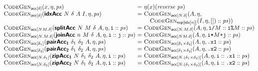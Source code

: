 \begin{figure}[H]
  \bigskip

  \begin{minipage}{1.0\linewidth}
    \begin{displaymath}
      \begin{array}{@{}l@{~}c@{~}l@{}}
        \codegenAcc{\delta}{x, \eta, \mathit{ps}}
        &=& \eta(x)(\mathit{reverse}~\mathit{ps})
        \\
        \codegenAcc{\mathsf{\delta}}{\prim{idxAcc}~N~\delta~A~I, \eta, \mathit{ps}}
        &=& \begin{array}[t]{@{}l}
          \codegenAcc{N.\delta}{A, \eta,\\ \quad\codegenExp{\mathsf{idx}[n]}{I, \eta, []} :: \mathit{ps})}
        \end{array}
        \\
        \codegenAcc{NM.\delta}{\prim{splitAcc}~N~M~\delta~A, \eta, \texttt{i} :: \mathit{ps}}
        &=& \codegenAcc{N.M.\delta}{A, \eta, \texttt{i/}M :: \texttt{i\%}M :: \mathit{ps}}
        \\
        \codegenAcc{N.M.\delta}{\prim{joinAcc}~n~M~\delta~A, \eta, \texttt{i} :: \texttt{j} :: \mathit{ps}}
        &=& \codegenAcc{NM.\delta}{A, \eta, \texttt{i*}M\texttt{+j} :: \mathit{ps}}
        \\
        \codegenAcc{\delta_1}{\prim{pairAcc_1}~\delta_1~\delta_2~A, \eta, \mathit{ps}}
        &=& \codegenAcc{\delta_1\times\delta_2}{A, \eta, \texttt{.x1} :: \mathit{ps}}
        \\
        \codegenAcc{\delta_2}{\prim{pairAcc_2}~\delta_1~\delta_2~A, \eta, \mathit{ps}}
        &=& \codegenAcc{\delta_1\times\delta_2}{A, \eta, \texttt{.x2} :: \mathit{ps}}
        \\
        \codegenAcc{N.\delta_1}{\prim{zipAcc_1}~N~\delta_1~\delta_2~A, \eta, \texttt{i} :: \mathit{ps}}
        &=& \codegenAcc{N.(\delta_1\times\delta_2)}{A, \eta, \texttt{i} :: \texttt{.x1} :: \mathit{ps}}
        \\
        \codegenAcc{N.\delta_2}{\prim{zipAcc_2}~N~\delta_1~\delta_2~A, \eta, \texttt{i} :: \mathit{ps}}
        &=& \codegenAcc{N.(\delta_1\times\delta_2)}{A, \eta, \texttt{i} :: \texttt{.x2} :: \mathit{ps}}
      \end{array}
    \end{displaymath}
    \label{fig:codegen-acc}
  \end{minipage}

  \bigskip


\end{figure}

